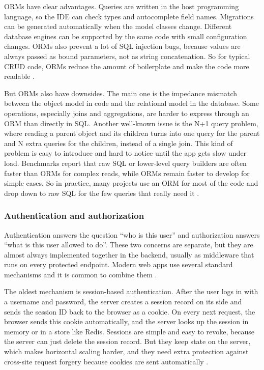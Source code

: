 ORMs have clear advantages. Queries are written in the host programming language, so the IDE can check types and autocomplete field names. Migrations can be generated automatically when the model classes change. Different database engines can be supported by the same code with small configuration changes. ORMs also prevent a lot of SQL injection bugs, because values are always passed as bound parameters, not as string concatenation. So for typical CRUD code, ORMs reduce the amount of boilerplate and make the code more readable \autocite{ivanov2024orm_mysql, marchuk2023db_access}.

But ORMs also have downsides. The main one is the impedance mismatch between the object model in code and the relational model in the database. Some operations, especially joins and aggregations, are harder to express through an ORM than directly in SQL. Another well-known issue is the N+1 query problem, where reading a parent object and its children turns into one query for the parent and N extra queries for the children, instead of a single join. This kind of problem is easy to introduce and hard to notice until the app gets slow under load. Benchmarks report that raw SQL or lower-level query builders are often faster than ORMs for complex reads, while ORMs remain faster to develop for simple cases. So in practice, many projects use an ORM for most of the code and drop down to raw SQL for the few queries that really need it \autocite{hermanto2025orm_sql, ivanov2024orm_mysql, yan2016orm_wild}.

\subsubsection{Authentication and authorization}
\label{sec:auth}

Authentication answers the question \enquote{who is this user} and authorization answers \enquote{what is this user allowed to do}. These two concerns are separate, but they are almost always implemented together in the backend, usually as middleware that runs on every protected endpoint. Modern web apps use several standard mechanisms and it is common to combine them \autocite{pyroh2025auth, golla2026auth_mechanisms, chinthalapudi2025security}.

The oldest mechanism is session-based authentication. After the user logs in with a username and password, the server creates a session record on its side and sends the session ID back to the browser as a cookie. On every next request, the browser sends this cookie automatically, and the server looks up the session in memory or in a store like Redis. Sessions are simple and easy to revoke, because the server can just delete the session record. But they keep state on the server, which makes horizontal scaling harder, and they need extra protection against cross-site request forgery because cookies are sent automatically \autocite{pyroh2025auth, koziel2020rest_auth_security}.

